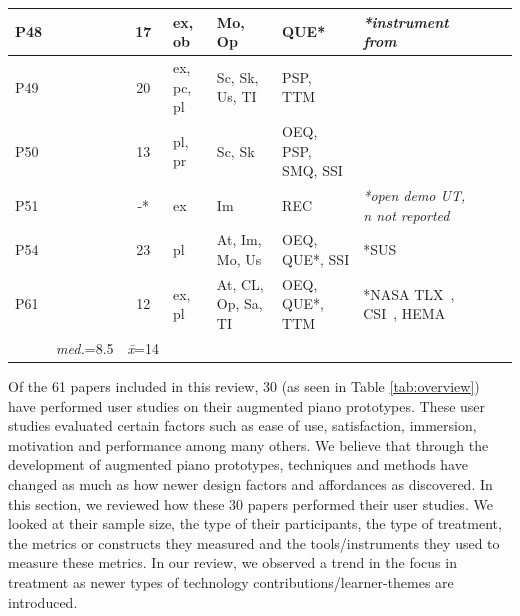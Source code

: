\documentclass[sigconf, screen, review]{acmart}
\begin{document}
\begin{table}[t]
\begin{tabularx}{\textwidth}{llclllllX}
P48 &\cite{li2018application}             & 17           & ex, ob      & Mo, Op                 & QUE*                  & \textit{*instrument from }\cite{zhang2000relationship}    \\ \hline
P49 &\cite{sun2018mr}                     & 20           & ex, pc, pl  & Sc, Sk, Us, TI         & PSP, TTM              &   \\ \hline
P50 &\cite{pan2018pilot}                  & 13           & pl, pr      & Sc, Sk                 & OEQ, PSP, SMQ, SSI    &  \\ \hline
P51 &\cite{granieri2019reach}             & -*           & ex          & Im                     & REC                   & \textit{*open demo UT, n not reported}  \\ \hline 
P54 &\cite{molloy2019mixed}               & 23           & pl          & At, Im, Mo, Us         & OEQ, QUE*, SSI        & *SUS~\cite{lewis2009factor}\\ \hline
P61 &\cite{karolus2020hit}                & 12           & ex, pl      & At, CL, Op, Sa, TI     & OEQ, QUE*, TTM                  &  *NASA TLX~\cite{hart1988development}, CSI~\cite{carroll2009creativity}, HEMA~\cite{huta2010pursuing} \\ \midrule 
                                   & \textit{med.}=8.5 & \textit{\={x}}=14   &                   &                       & \\ \bottomrule
\end{tabularx}%
\end{table}
Of the 61 papers included in this review, 30 (as seen in Table \ref{tab:overview}) have performed user studies on their augmented piano prototypes. These user studies evaluated certain factors such as ease of use, satisfaction, immersion, motivation and performance among many others. We believe that through the development of augmented piano prototypes, techniques and methods have changed as much as how newer design factors and affordances as discovered. In this section, we reviewed how these 30 papers performed their user studies. We looked at their sample size, the type of their participants, the type of treatment, the metrics or constructs they measured and the tools/instruments they used to measure these metrics. In our review, we observed a trend in the focus in treatment as newer types of technology contributions/learner-themes are introduced. 
\end{document}
